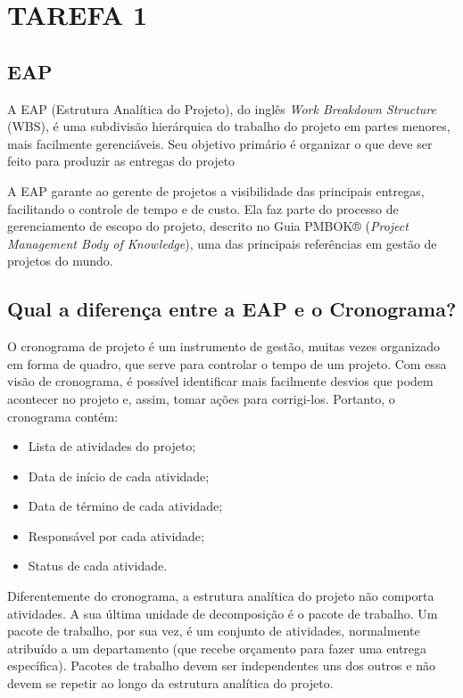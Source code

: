 
\chapter{TAREFA 1}
\label{sec:qualidade}

\section{EAP}

A EAP (Estrutura Analítica do Projeto), do inglês \textit{Work Breakdown Structure} (WBS), é uma subdivisão hierárquica do trabalho do projeto em partes menores, mais facilmente gerenciáveis. Seu objetivo primário é organizar o que deve ser feito para produzir as entregas do projeto

A EAP garante ao gerente de projetos a visibilidade das principais entregas, facilitando o controle de tempo e de custo. Ela faz parte do processo de gerenciamento de escopo do projeto, descrito no Guia PMBOK® (\textit{Project Management Body of Knowledge}), uma das principais referências em gestão de projetos do mundo.

\section{Qual a diferença entre a EAP e o Cronograma?}

O cronograma de projeto é um instrumento de gestão, muitas vezes organizado em forma de quadro, que serve para controlar o tempo de um projeto. Com essa visão de cronograma, é possível identificar mais facilmente desvios que podem acontecer no projeto e, assim, tomar ações para corrigi-los. Portanto, o cronograma contém:


\begin{itemize}
\item Lista de atividades do projeto;
\item Data de início de cada atividade;
\item Data de término de cada atividade;
\item Responsável por cada atividade;
\item Status de cada atividade.
\end{itemize}

Diferentemente do cronograma, a estrutura analítica do projeto não comporta atividades. A sua última unidade de decomposição é o pacote de trabalho. Um pacote de trabalho, por sua vez, é um conjunto de atividades, normalmente atribuído a um departamento (que recebe orçamento para fazer uma entrega específica). Pacotes de trabalho devem ser independentes uns dos outros e não devem se repetir ao longo da estrutura analítica do projeto.

